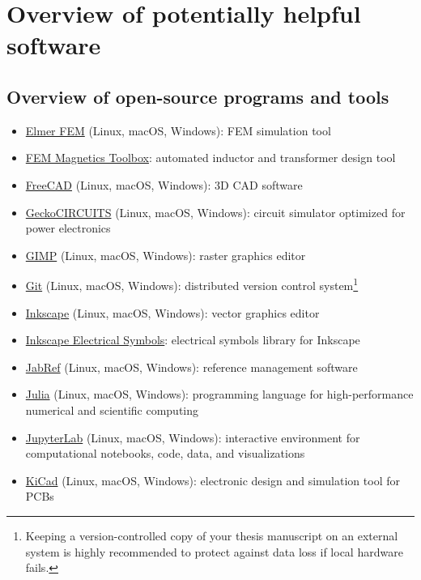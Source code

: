 \chapter{Overview of potentially helpful software}
\label{cha:software}

\section{Overview of open-source programs and tools}
\begin{itemize}
	\item \href{https://github.com/ElmerCSC/elmerfem}{Elmer FEM} (Linux, macOS, Windows): FEM simulation tool
	\item \href{https://github.com/upb-lea/FEM_Magnetics_Toolbox}{FEM Magnetics Toolbox}: automated inductor and transformer design tool
	\item \href{https://en.wikipedia.org/wiki/FreeCAD}{FreeCAD} (Linux, macOS, Windows): 3D CAD software
	\item \href{https://github.com/geckocircuits/GeckoCIRCUITS}{GeckoCIRCUITS} (Linux, macOS, Windows): circuit simulator optimized for power electronics
	\item \href{https://en.wikipedia.org/wiki/GIMP}{GIMP} (Linux, macOS, Windows): raster graphics editor
	\item \href{https://git-scm.com/}{Git} (Linux, macOS, Windows): distributed version control system\footnote{Keeping a version-controlled copy of your thesis manuscript on an external system is highly recommended to protect against data loss if local hardware fails.}
	\item \href{https://en.wikipedia.org/wiki/Inkscape}{Inkscape} (Linux, macOS, Windows): vector graphics editor
	\item \href{https://github.com/upb-lea/Inkscape_electric_Symbols}{Inkscape Electrical Symbols}: electrical symbols library for Inkscape
	\item \href{https://en.wikipedia.org/wiki/JabRef}{JabRef} (Linux, macOS, Windows): reference management software
	\item \href{https://julialang.org/}{Julia} (Linux, macOS, Windows): programming language for high-performance numerical and scientific computing
	\item \href{https://jupyter.org/}{JupyterLab} (Linux, macOS, Windows): interactive environment for computational notebooks, code, data, and visualizations
	\item \href{https://en.wikipedia.org/wiki/KiCad}{KiCad} (Linux, macOS, Windows): electronic design and simulation tool for PCBs

\end{itemize}
